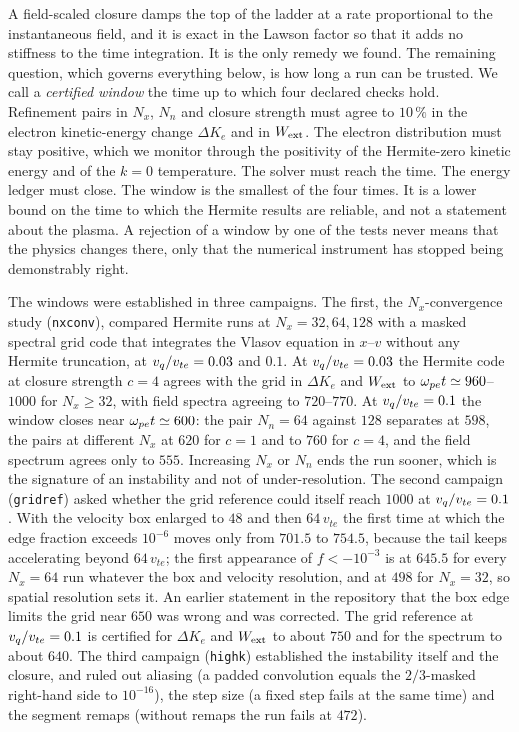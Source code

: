 A field-scaled closure damps the top of the ladder at a rate proportional to the instantaneous field, and it is exact in the Lawson factor so that it adds no stiffness to the time integration. It is the only remedy we found. The remaining question, which governs everything below, is how long a run can be trusted. We call a \emph{certified window} the time up to which four declared checks hold. Refinement pairs in $N_x$, $N_n$ and closure strength must agree to $10\,\%$ in the electron kinetic-energy change $\Delta K_e$ and in $W_{\rm ext}$. The electron distribution must stay positive, which we monitor through the positivity of the Hermite-zero kinetic energy and of the $k=0$ temperature. The solver must reach the time. The energy ledger must close. The window is the smallest of the four times. It is a lower bound on the time to which the Hermite results are reliable, and not a statement about the plasma. A rejection of a window by one of the tests never means that the physics changes there, only that the numerical instrument has stopped being demonstrably right.


The windows were established in three campaigns. The first, the $N_x$-convergence study (\texttt{nxconv}), compared Hermite runs at $N_x=32,64,128$ with a masked spectral grid code that integrates the Vlasov equation in $x$--$v$ without any Hermite truncation, at $v_q/v_{te}=0.03$ and $0.1$. At $v_q/v_{te}=0.03$ the Hermite code at closure strength $c=4$ agrees with the grid in $\Delta K_e$ and $W_{\rm ext}$ to $\omega_{pe} t\simeq960$--$1000$ for $N_x\ge32$, with field spectra agreeing to $720$--$770$. At $v_q/v_{te}=0.1$ the window closes near $\omega_{pe} t\simeq600$: the pair $N_n=64$ against $128$ separates at $598$, the pairs at different $N_x$ at $620$ for $c=1$ and to $760$ for $c=4$, and the field spectrum agrees only to $555$. Increasing $N_x$ or $N_n$ ends the run sooner, which is the signature of an instability and not of under-resolution. The second campaign (\texttt{gridref}) asked whether the grid reference could itself reach $1000$ at $v_q/v_{te}=0.1$. With the velocity box enlarged to $48$ and then $64\,v_{te}$ the first time at which the edge fraction exceeds $10^{-6}$ moves only from $701.5$ to $754.5$, because the tail keeps accelerating beyond $64\,v_{te}$; the first appearance of $f<-10^{-3}$ is at $645.5$ for every $N_x=64$ run whatever the box and velocity resolution, and at $498$ for $N_x=32$, so spatial resolution sets it. An earlier statement in the repository that the box edge limits the grid near $650$ was wrong and was corrected. The grid reference at $v_q/v_{te}=0.1$ is certified for $\Delta K_e$ and $W_{\rm ext}$ to about $750$ and for the spectrum to about $640$. The third campaign (\texttt{highk}) established the instability itself and the closure, and ruled out aliasing (a padded convolution equals the $2/3$-masked right-hand side to $10^{-16}$), the step size (a fixed step fails at the same time) and the segment remaps (without remaps the run fails at $472$).

